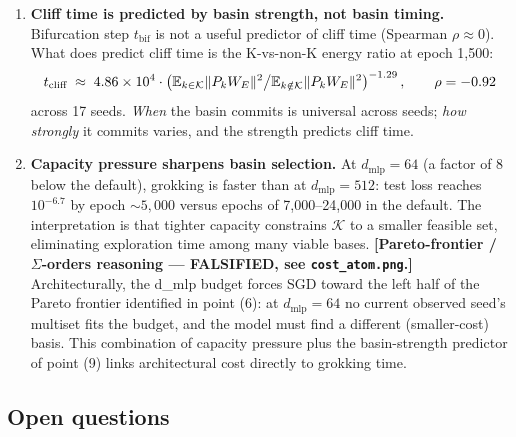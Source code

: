 \begin{enumerate}
\item \textbf{Cliff time is predicted by basin strength, not basin
  timing.} Bifurcation step $t_{\text{bif}}$ is not a useful predictor
  of cliff time (Spearman $\rho \approx 0$). What does predict cliff
  time is the K-vs-non-K energy ratio at epoch 1{,}500:
  \begin{equation}
    t_{\text{cliff}}
    \;\approx\; 4.86 \times 10^4 \cdot
    \left(
      \mathbb{E}_{k \in \mathcal K} \|P_k W_E\|^2 \big/
      \mathbb{E}_{k \notin \mathcal K} \|P_k W_E\|^2
    \right)^{-1.29},
    \qquad \rho = -0.92
    \label{eq:cliff-pred}
  \end{equation}
  across 17 seeds. \emph{When} the basin commits is universal across
  seeds; \emph{how strongly} it commits varies, and the strength
  predicts cliff time.

\item \textbf{Capacity pressure sharpens basin selection.} At
  $d_{\text{mlp}} = 64$ (a factor of 8 below the default), grokking is
  faster than at $d_{\text{mlp}} = 512$: test loss reaches
  $10^{-6.7}$ by epoch $\sim 5{,}000$ versus epochs of 7{,}000--24{,}000
  in the default. The interpretation is that tighter capacity
  constrains $\mathcal K$ to a smaller feasible set, eliminating
  exploration time among many viable bases. {\color{red}\textbf{[Pareto-frontier / $\Sigma$-orders reasoning --- FALSIFIED, see \texttt{cost\_atom.png}.]} Architecturally,
  the d\_mlp budget forces SGD toward the left half of the
  Pareto frontier identified in point (6): at $d_{\text{mlp}} = 64$
  no current observed seed's multiset fits the budget, and the model
  must find a different (smaller-cost) basis.} This combination of
  capacity pressure plus the basin-strength predictor of point (9)
  links architectural cost directly to grokking time.

\end{enumerate}

\subsection{Open questions}
\label{subsec:findings-open}

